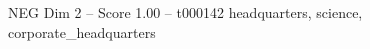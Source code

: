 \begin{textsample}{NEG Dim 2 – Score 1.00 – t000142}  \label{ex:f2_neg_036}
headquarters, science, corporate\_headquarters

\end{textsample}
